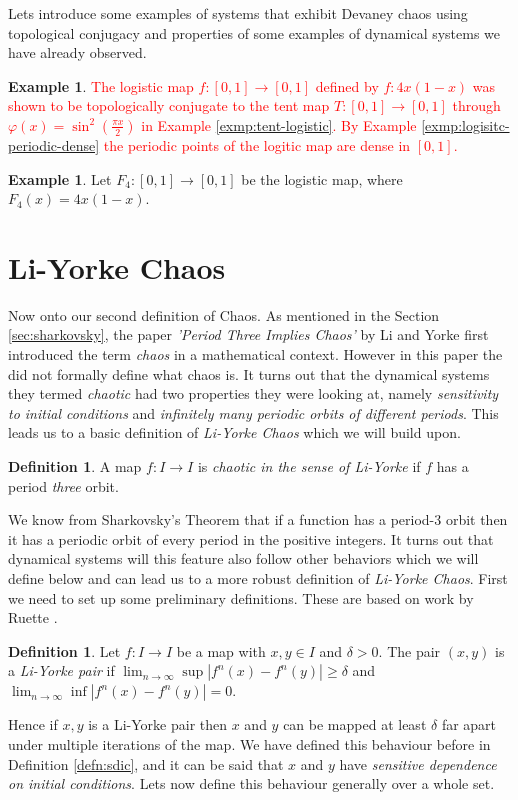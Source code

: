 \documentclass[11pt,a4paper,oneside]{memoir}
\theoremstyle{plain}
\theoremstyle{definition}
\newtheorem{defn}[thm]{Definition}
\newtheorem{exmp}[thm]{Example}
\begin{document}
Lets introduce some examples of systems that exhibit Devaney chaos using topological conjugacy and properties of some examples of dynamical systems we have already observed.

\begin{exmp}
    \textcolor{red}{The logistic map $f: [0, 1] \to [0, 1]$ defined by $f: 4x (1-x)$ was shown to be topologically conjugate to the tent map $T: [0, 1] \to [0, 1]$ through $\varphi(x) = \sin^2(\frac{\pi x}{2})$ in Example \ref{exmp:tent-logistic}. By Example \ref{exmp:logisitc-periodic-dense} the periodic points of the logitic map are dense in $[0,1]$. }
\end{exmp}

\begin{exmp}
    Let $F_4: [0, 1] \to [0,1]$ be the logistic map, where $F_4(x) = 4x(1-x)$.
\end{exmp}

\section{Li-Yorke Chaos}

Now onto our second definition of Chaos. As mentioned in the Section \ref{sec:sharkovsky}, the paper \emph{'Period Three Implies Chaos'} by Li and Yorke \cite{li-yorke} first introduced the term \emph{chaos} in a mathematical context. However in this paper the did not formally define what chaos is. It turns out that the dynamical systems they termed \emph{chaotic} had two properties they were looking at, namely \emph{sensitivity to initial conditions} and \emph{infinitely many periodic orbits of different periods}. This leads us to a basic definition of \emph{Li-Yorke Chaos} which we will build upon.

\begin{defn}
    A map $f: I \to I$ is \emph{chaotic in the sense of Li-Yorke} if $f$ has a period \emph{three} orbit.
\end{defn}

We know from Sharkovsky's Theorem that if a function has a period-3 orbit then it has a periodic orbit of every period in the positive integers. It turns out that dynamical systems will this feature also follow other behaviors which we will define below and can lead us to a more robust definition of \emph{Li-Yorke Chaos}. First we need to set up some preliminary definitions. These are based on work by Ruette \cite[Section 5.1]{ruette}.

\begin{defn}
    Let $f: I \to I$ be a map with $x, y \in I$ and $\delta > 0$. The pair $(x, y)$ is a \emph{Li-Yorke pair} if $\lim_{n \to \infty}\sup \left\lvert f^n(x) - f^n(y) \right\rvert \geq \delta$ and $\lim_{n\to\infty}\inf \left\lvert f^n(x) - f^n(y) \right\rvert = 0$.
\end{defn}
Hence if $x, y$ is a Li-Yorke pair then $x$ and $y$ can be mapped at least $\delta$ far apart under multiple iterations of the map. We have defined this behaviour before in Definition \ref{defn:sdic}, and it can be said that $x$ and $y$ have \emph{sensitive dependence on initial conditions}. Lets now define this behaviour generally over a whole set.
\end{document}
